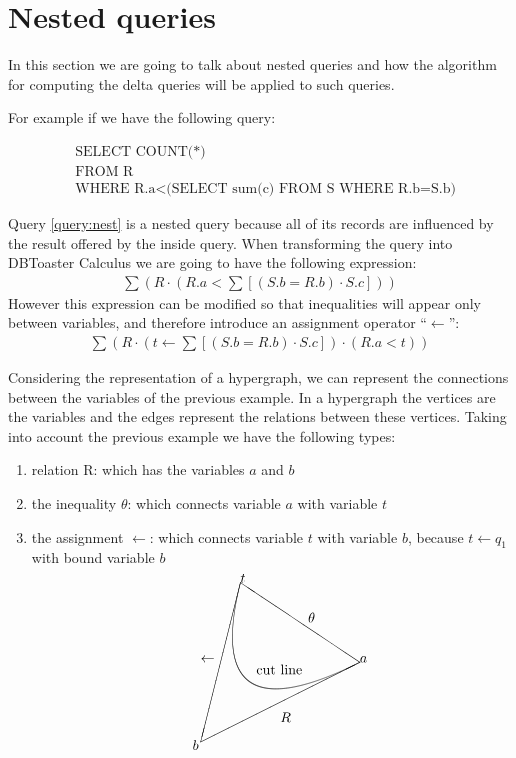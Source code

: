 \documentclass[12pt]{article}
\begin{document}
\section{Nested queries}

In this section we are going to talk about nested queries and how the algorithm for computing the delta queries will be applied to such queries. 

For example if we have the following query:

\begin{align}
\label{query:nest}
&\mbox{SELECT COUNT(*) }\\
&\mbox{FROM R}\nonumber\\
&\mbox{WHERE R.a}<\mbox{(SELECT sum(c) FROM S WHERE R.b=S.b)}\nonumber
\end{align}

Query \ref{query:nest} is a nested query because all of its records are influenced by the result offered by the inside query. When transforming the query into DBToaster Calculus we are going to have the following expression:
\begin{align}
\sum(R\cdot(R.a<\sum[(S.b=R.b)\cdot S.c]))
\end{align}
However this expression can be modified so that inequalities will appear only between variables, and therefore introduce an assignment operator ``$\gets$'':
\begin{align}
\label{form}\sum(R\cdot(t\gets\sum[(S.b=R.b)\cdot S.c])\cdot(R.a<t))
\end{align}

Considering the representation of a hypergraph, we can represent the connections between the variables of the previous example. In a hypergraph the vertices are the variables and the edges represent the relations between these vertices. Taking into account the previous example we have the following types:
\begin{enumerate}
\item relation R: which has the variables $a$ and $b$
\item the inequality $\theta$: which connects variable $a$ with variable $t$
\item the assignment $\gets$: which connects variable $t$ with variable $b$, because $t\gets q_{1}$ with bound variable $b$
\end{enumerate}
\begin{align}
\label{hyper}
\setlength{\unitlength}{1mm}
\begin{picture}(50,50)
\put(50,30){\line(-3,2){30}}
\put(20,50){\line(-1,-4){10}}
\put(10,10){\line(2,1){40}}
\qbezier(50,30)(10,10)(20,50)
\put(50,30){$a$}
\put(20,50){$t$}
\put(8,8){$b$}
\put(30,15){$R$}
\put(37,40){$\theta$}
\put(10,30){$\gets$}
\put(24,27){\mbox{cut line}}
\end{picture}
\end{align}
\end{document}
